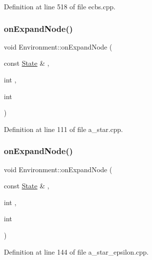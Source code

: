Definition at line 518 of file ecbs.\+cpp.

\mbox{\label{class_environment_a37ccf718e3e1b4540dadbe89f1631ee6}} 
\subsubsection{\texorpdfstring{on\+Expand\+Node()}{onExpandNode()}\hspace{0.1cm}{\footnotesize\ttfamily [1/2]}}
{\footnotesize\ttfamily void Environment\+::on\+Expand\+Node (\begin{DoxyParamCaption}\item[{const \hyperlink{struct_state}{State} \&}]{,  }\item[{int}]{,  }\item[{int}]{ }\end{DoxyParamCaption})\hspace{0.3cm}{\ttfamily [inline]}}



Definition at line 111 of file a\+\_\+star.\+cpp.

\mbox{\label{class_environment_a37ccf718e3e1b4540dadbe89f1631ee6}} 
\subsubsection{\texorpdfstring{on\+Expand\+Node()}{onExpandNode()}\hspace{0.1cm}{\footnotesize\ttfamily [2/2]}}
{\footnotesize\ttfamily void Environment\+::on\+Expand\+Node (\begin{DoxyParamCaption}\item[{const \hyperlink{struct_state}{State} \&}]{,  }\item[{int}]{,  }\item[{int}]{ }\end{DoxyParamCaption})\hspace{0.3cm}{\ttfamily [inline]}}



Definition at line 144 of file a\+\_\+star\+\_\+epsilon.\+cpp.

\mbox{\label{class_environment_a31a390fc46a51b9adab61b2511ef2a31}} 
